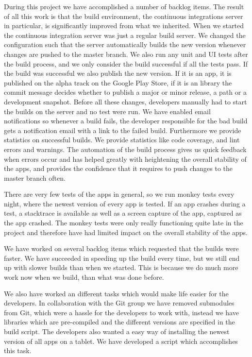 During this project we have accomplished a number of backlog items. The result of all this work is that the build environment, the continuous integrations server in particular, is significantly improved from what we inherited. When we started the continuous integration server was just a regular build server. We changed the configuration such that the server automatically builds the new version whenever changes are pushed to the master branch. We also run any unit and UI tests after the build process, and we only consider the build successful if all the tests pass. If the build was successful we also publish the new version. If it is an app, it is published on the alpha track on the Google Play Store, if it is an library the commit message decides whether to publish a major or minor release, a path or a development snapshot. Before all these changes, developers manually had to start the builds on the server and no test were run. We have enabled email notifications so whenever a build fails, the developer responsible for the bad build gets a notification email with a link to the failed build. Furthermore we provide statistics on successful builds. We provide statistics like code coverage, and lint errors and warnings. The automation of the build process gives us quick feedback when errors occur and has helped greatly with heightening the overall stability of the apps, and provides the confidence that it requires to push changes to the master branch often. 

There are very few tests of the apps in general, so we run monkey tests every night, where the newest version of every app is tested. If an app crashes during a test, a stacktrace is available as well as a screen capture of the app, captured as the app crashed. The monkey tests were only really functioning quite late in the project and therefore have had limited impact on the overall stability of the apps.

We have worked on several backlog items which requested that the builds were faster. We have succeeded in speeding up the build every time, but we still end up with slower builds than when we started. This is because we do much more work now when we build, than what was done before.

We also have worked an different tasks which would make life easier for the developers. In collaboration with the Git group we have removed submodules from Git, which were a hassle for the developers to work with, instead we have libraries which are pre-compiled and the different versions are specified in the build script. The developers also wanted a easy way of installing the newest version of all apps on a tablet. We have developed a script which accomplishes this task.

